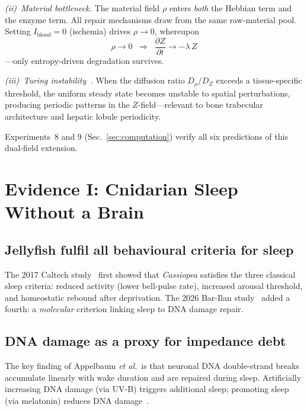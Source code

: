 ﻿\documentclass[aps,pre,twocolumn,superscriptaddress,floatfix]{revtex4-2}
\begin{document}
\emph{(ii)~Material bottleneck.}
The material field $\rho$ enters \emph{both} the Hebbian
term and the enzyme term.
All repair mechanisms draw from the same raw-material pool.
Setting $I_{\mathrm{blood}} = 0$ (ischemia)
drives $\rho \to 0$, whereupon
\begin{equation}
  \rho \to 0 \;\;\Longrightarrow\;\;
  \frac{\partial Z}{\partial t} \to -\lambda\,Z
  \label{eq:ischemia-limit}
\end{equation}
---only entropy-driven degradation survives.

\emph{(iii)~Turing instability~\cite{Turing1952}.}
When the diffusion ratio $D_\rho / D_Z$ exceeds a
tissue-specific threshold, the uniform steady state becomes
unstable to spatial perturbations, producing periodic patterns
in the $Z$-field---relevant to bone trabecular architecture
and hepatic lobule periodicity.

Experiments~8 and 9 (Sec.~\ref{sec:computation})
verify all six predictions of this dual-field extension.


\section{Evidence I: Cnidarian Sleep Without a Brain}
\label{sec:cnidaria}

\subsection{Jellyfish fulfil all behavioural criteria for sleep}

The 2017 Caltech study~\cite{Nath2017} first showed that
\textit{Cassiopea} satisfies the three classical sleep criteria:
reduced activity (lower bell-pulse rate),
increased arousal threshold,
and homeostatic rebound after deprivation.
The 2026 Bar-Ilan study~\cite{Appelbaum2026} added a fourth:
a \emph{molecular} criterion linking sleep to DNA damage repair.

\subsection{DNA damage as a proxy for impedance debt}

The key finding of Appelbaum \emph{et al.}\ is that
neuronal DNA double-strand breaks accumulate linearly
with wake duration and are repaired during sleep.
Artificially increasing DNA damage (via UV-B) triggers
additional sleep; promoting sleep (via melatonin) reduces
DNA damage~\cite{Appelbaum2026}.
\end{document}
